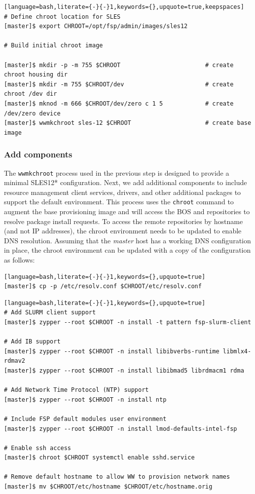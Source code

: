 \documentclass[letterpaper]{article}
\newcommand{\baseOS}{SLES12*}
\begin{document}
\begin{lstlisting}[language=bash,literate={-}{-}1,keywords={},upquote=true,keepspaces]
# Define chroot location for SLES 
[master]$ export CHROOT=/opt/fsp/admin/images/sles12

# Build initial chroot image

[master]$ mkdir -p -m 755 $CHROOT                        # create chroot housing dir
[master]$ mkdir -m 755 $CHROOT/dev                       # create chroot /dev dir
[master]$ mknod -m 666 $CHROOT/dev/zero c 1 5            # create /dev/zero device
[master]$ wwmkchroot sles-12 $CHROOT                     # create base image
\end{lstlisting}

\subsubsection{Add \FSP{} components}

The \texttt{wwmkchroot} process used in the previous step is designed to
provide a minimal \baseOS{} configuration. Next, we add additional components to
include resource management client services, \InfiniBand{} drivers, and other
additional packages to support the default \FSP{} environment.  This process uses
the \texttt{chroot} command to augment the base provisioning image and will
access the BOS and \FSP{} repositories to resolve package install requests. To
access the remote repositories by hostname (and not IP addresses), the chroot
environment needs to be updated to enable DNS resolution. Assuming that
the {\em master} host has a working DNS configuration in place, the chroot environment can
be updated with a copy of the configuration as follows:

\begin{lstlisting}[language=bash,literate={-}{-}1,keywords={},upquote=true]
[master]$ cp -p /etc/resolv.conf $CHROOT/etc/resolv.conf
\end{lstlisting}

\newpage
\begin{lstlisting}[language=bash,literate={-}{-}1,keywords={},upquote=true]
# Add SLURM client support
[master]$ zypper --root $CHROOT -n install -t pattern fsp-slurm-client

# Add IB support
[master]$ zypper --root $CHROOT -n install libibverbs-runtime libmlx4-rdmav2
[master]$ zypper --root $CHROOT -n install libibmad5 librdmacm1 rdma

# Add Network Time Protocol (NTP) support
[master]$ zypper --root $CHROOT -n install ntp

# Include FSP default modules user environment
[master]$ zypper --root $CHROOT -n install lmod-defaults-intel-fsp

# Enable ssh access 
[master]$ chroot $CHROOT systemctl enable sshd.service

# Remove default hostname to allow WW to provision network names
[master]$ mv $CHROOT/etc/hostname $CHROOT/etc/hostname.orig
\end{lstlisting}
\end{document}
